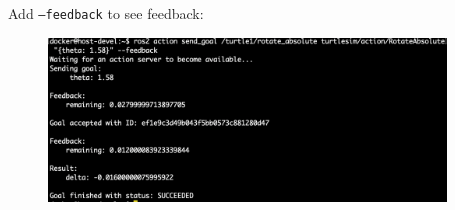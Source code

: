 \documentclass[12pt, a4paper]{article}
\begin{document}
\begin{enumerate}
\newpage
Add \texttt{--feedback} to see feedback:
\begin{figure}[h]
	\setlength{\leftskip}{2.4em}
	\includegraphics[width=0.94\textwidth]{p1.7-7}
\end{figure}
\end{enumerate}

\newpage
\end{document}
